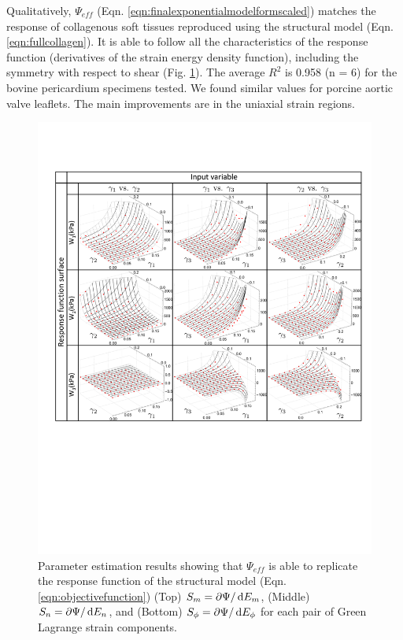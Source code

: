     
    Qualitatively, $\Psi_{eff}$ (Eqn. \ref{eqn:finalexponentialmodelformscaled}) matches the response of collagenous soft tissues reproduced using the structural model (Eqn. \ref{eqn:fullcollagen}). It is able to follow all the characteristics of the response function (derivatives of the strain energy density function), including the symmetry with respect to shear (Fig. \ref{fig:modelfit}). The average $R^2$ is 0.958 (n = 6) for the bovine pericardium specimens tested. We found similar values for porcine aortic valve leaflets. The main improvements are in the uniaxial strain regions. 
\begin{figure}[hptb]
\centering
\includegraphics[width=\textwidth]{Images/chapter5/modelfit}
\caption{Parameter estimation results showing that $\Psi_{eff}$ is able to replicate the response function of the structural model (Eqn. \ref{eqn:objectivefunction}) (Top) $S_m = \partial\Psi/\dif E_m$, (Middle) $S_n = \partial\Psi/\dif E_n$, and (Bottom) $S_\phi = \partial\Psi/\dif E_\phi$ for each pair of Green Lagrange strain components.}
\label{fig:modelfit}
\end{figure} 


